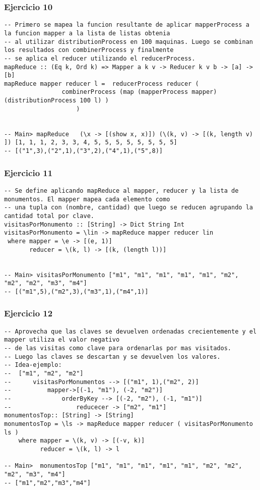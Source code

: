 \subsubsection*{Ejercicio 10}
\begin{lstlisting}
-- Primero se mapea la funcion resultante de aplicar mapperProcess a la funcion mapper a la lista de listas obtenia
-- al utilizar distributionProcess en 100 maquinas. Luego se combinan los resultados con combinerProcess y finalmente
-- se aplica el reducer utilizando el reducerProcess.
mapReduce :: (Eq k, Ord k) => Mapper a k v -> Reducer k v b -> [a] -> [b]
mapReduce mapper reducer l =  reducerProcess reducer (
				combinerProcess (map (mapperProcess mapper) (distributionProcess 100 l) ) 
					)


-- Main> mapReduce   (\x -> [(show x, x)]) (\(k, v) -> [(k, length v) ]) [1, 1, 1, 2, 3, 3, 4, 5, 5, 5, 5, 5, 5, 5, 5]
-- [("1",3),("2",1),("3",2),("4",1),("5",8)]
\end{lstlisting}
\vspace{1cm}


\subsubsection*{Ejercicio 11}
\begin{lstlisting}
-- Se define aplicando mapReduce al mapper, reducer y la lista de monumentos. El mapper mapea cada elemento como
-- una tupla con (nombre, cantidad) que luego se reducen agrupando la cantidad total por clave.
visitasPorMonumento :: [String] -> Dict String Int
visitasPorMonumento = \lin -> mapReduce mapper reducer lin
 where mapper = \e -> [(e, 1)]
       reducer = \(k, l) -> [(k, (length l))]


-- Main> visitasPorMonumento ["m1", "m1", "m1", "m1", "m1", "m2", "m2", "m2", "m3", "m4"]
-- [("m1",5),("m2",3),("m3",1),("m4",1)]
\end{lstlisting}
\vspace{1cm}

\subsubsection*{Ejercicio 12}
\begin{lstlisting}
-- Aprovecha que las claves se devuelven ordenadas crecientemente y el mapper utiliza el valor negativo
-- de las visitas como clave para ordenarlas por mas visitados. 
-- Luego las claves se descartan y se devuelven los valores.
-- Idea-ejemplo:
--	["m1", "m2", "m2"] 
--		visitasPorMonumentos --> [("m1", 1),("m2", 2)]
--			mapper->[(-1, "m1"), (-2, "m2")] 
--				orderByKey --> [(-2, "m2"), (-1, "m1")] 
--					reducecer -> ["m2", "m1"]
monumentosTop:: [String] -> [String]
monumentosTop = \ls -> mapReduce mapper reducer ( visitasPorMonumento ls ) 
	where mapper = \(k, v) -> [(-v, k)]
	      reducer = \(k, l) -> l

-- Main>  monumentosTop ["m1", "m1", "m1", "m1", "m1", "m2", "m2", "m2", "m3", "m4"]
-- ["m1","m2","m3","m4"]
\end{lstlisting}
\vspace{1cm}

